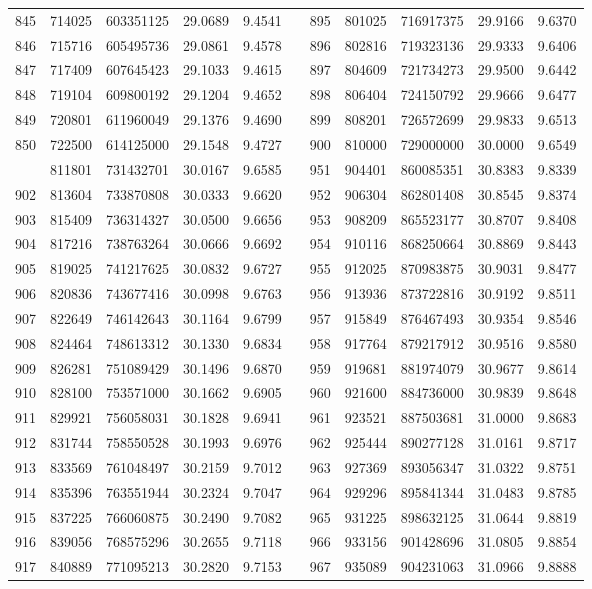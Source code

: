\begin{longtable}{rrrrrrrrrrr}
845&714025&603351125&29.0689&9.4541&&895&801025&716917375&29.9166&9.6370\\
846&715716&605495736&29.0861&9.4578&&896&802816&719323136&29.9333&9.6406\\
847&717409&607645423&29.1033&9.4615&&897&804609&721734273&29.9500&9.6442\\
848&719104&609800192&29.1204&9.4652&&898&806404&724150792&29.9666&9.6477\\
849&720801&611960049&29.1376&9.4690&&899&808201&726572699&29.9833&9.6513\\
850&722500&614125000&29.1548&9.4727&&900&810000&729000000&30.0000&9.6549\\
\newpage
901&811801&731432701&30.0167&9.6585&&951&904401&860085351&30.8383&9.8339\\
902&813604&733870808&30.0333&9.6620&&952&906304&862801408&30.8545&9.8374\\
903&815409&736314327&30.0500&9.6656&&953&908209&865523177&30.8707&9.8408\\
904&817216&738763264&30.0666&9.6692&&954&910116&868250664&30.8869&9.8443\\
905&819025&741217625&30.0832&9.6727&&955&912025&870983875&30.9031&9.8477\\
906&820836&743677416&30.0998&9.6763&&956&913936&873722816&30.9192&9.8511\\
907&822649&746142643&30.1164&9.6799&&957&915849&876467493&30.9354&9.8546\\
908&824464&748613312&30.1330&9.6834&&958&917764&879217912&30.9516&9.8580\\
909&826281&751089429&30.1496&9.6870&&959&919681&881974079&30.9677&9.8614\\
910&828100&753571000&30.1662&9.6905&&960&921600&884736000&30.9839&9.8648\\
911&829921&756058031&30.1828&9.6941&&961&923521&887503681&31.0000&9.8683\\
912&831744&758550528&30.1993&9.6976&&962&925444&890277128&31.0161&9.8717\\
913&833569&761048497&30.2159&9.7012&&963&927369&893056347&31.0322&9.8751\\
914&835396&763551944&30.2324&9.7047&&964&929296&895841344&31.0483&9.8785\\
915&837225&766060875&30.2490&9.7082&&965&931225&898632125&31.0644&9.8819\\
916&839056&768575296&30.2655&9.7118&&966&933156&901428696&31.0805&9.8854\\
917&840889&771095213&30.2820&9.7153&&967&935089&904231063&31.0966&9.8888\\

\end{longtable}
